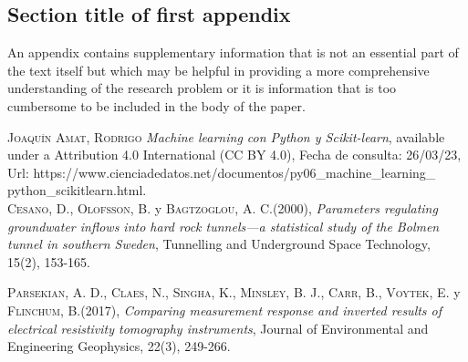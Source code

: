\documentclass[sn-mathphys,Numbered]{sn-jnl}%
\theoremstyle{thmstyleone}%
\theoremstyle{thmstyletwo}%
\theoremstyle{thmstylethree}%
\begin{document}
\begin{appendices}

\section{Section title of first appendix}\label{secA1}

An appendix contains supplementary information that is not an essential part of the text itself but which may be helpful in providing a more comprehensive understanding of the research problem or it is information that is too cumbersome to be included in the body of the paper.




\end{appendices}


	\begin{thebibliography}{X}\label{sec7}
	
	 \textsc{Joaquín Amat, Rodrigo}
	\textit{Machine learning con Python y Scikit-learn}, available under a Attribution 4.0 International (CC BY 4.0), Fecha de consulta: 26/03/23,\\
	Url: https://www.cienciadedatos.net/documentos/py06\_machine\_learning\_\\
	python\_scikitlearn.html.\\
	
	 \textsc{Cesano, D., Olofsson, B.} y \textsc{Bagtzoglou, A. C.}(2000),
	\textit{Parameters regulating groundwater inflows into hard rock tunnels—a statistical study of the Bolmen tunnel in southern Sweden}, Tunnelling and Underground Space Technology, 15(2), 153-165.
	
	 \textsc{Parsekian, A. D., Claes, N., Singha, K., Minsley, B. J., Carr, B., Voytek, E.} y \textsc{Flinchum, B.}(2017),
	\textit{Comparing measurement response and inverted results of electrical resistivity tomography instruments}, Journal of Environmental and Engineering Geophysics, 22(3), 249-266.
	
	
	
	
	
	\end{thebibliography}
\end{document}
